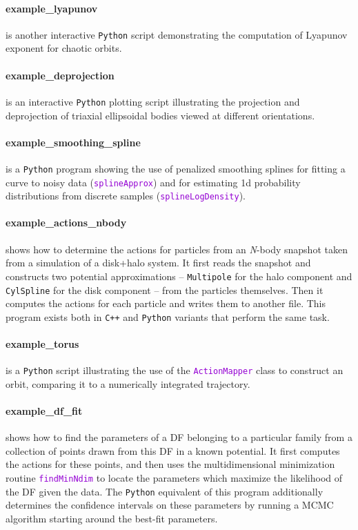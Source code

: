 \documentclass[12pt]{article}
\newcommand{\Nbody}{\textsl{N}-body\xspace}
\newcommand{\Cpp}  {\texttt{C++}\xspace}
\newcommand{\Python}{\texttt{Python}\xspace}
\newcommand{\ttt}[1]{\textcolor{darkviolet}{\texttt{#1}}}
\newcommand{\ppp}[1]{\textcolor{darkolive} {\texttt{#1}}}
\let\oldparagraph\paragraph
\renewcommand{\paragraph}[1]{\vspace{-2mm}\oldparagraph{#1}}
\begin{document}
\paragraph{example_lyapunov} is another interactive \Python script demonstrating the computation of Lyapunov exponent for chaotic orbits.

\paragraph{example_deprojection} is an interactive \Python plotting script illustrating the projection and deprojection of triaxial ellipsoidal bodies viewed at different orientations.

\paragraph{example_smoothing_spline} is a \Python program showing the use of penalized smoothing splines for fitting a curve to noisy data (\ttt{splineApprox}) and for estimating 1d probability distributions from discrete samples (\ttt{splineLogDensity}).

\paragraph{example_actions_nbody} shows how to determine the actions for particles from an \Nbody snapshot taken from a simulation of a disk+halo system. It first reads the snapshot and constructs two potential approximations -- \ppp{Multipole} for the halo component and \ppp{CylSpline} for the disk component -- from the particles themselves. Then it computes the actions for each particle and writes them to another file. This program exists both in \Cpp and \Python variants that perform the same task.

\paragraph{example_torus} is a \Python script illustrating the use of the \ttt{ActionMapper} class to construct an orbit, comparing it to a numerically integrated trajectory.

\paragraph{example_df_fit} shows how to find the parameters of a DF belonging to a particular family from a collection of points drawn from this DF in a known potential. It first computes the actions for these points, and then uses the multidimensional minimization routine \ttt{findMinNdim} to locate the parameters which maximize the likelihood of the DF given the data.
The \Python equivalent of this program additionally determines the confidence intervals on these parameters by running a MCMC algorithm starting around the best-fit parameters.
\end{document}
